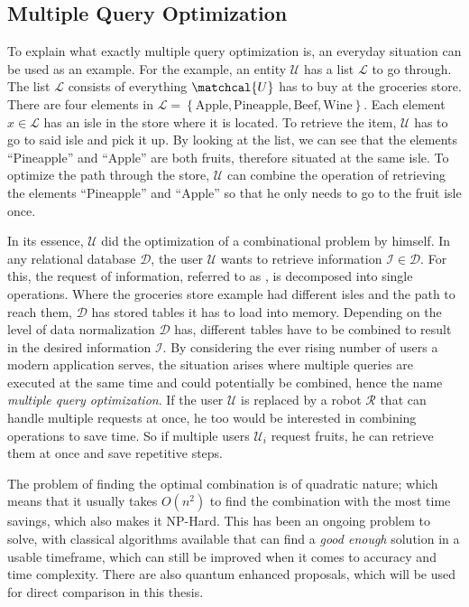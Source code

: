 \subsection{Multiple Query Optimization}
To explain what exactly multiple query optimization is, an everyday situation can be used as an example. For the example, an entity $\mathcal{U}$ has a list $\mathcal{L}$ to go through. The list $\mathcal{L}$ consists of everything $\matchcal{U}$ has to buy at the groceries store. There are four elements in $\mathcal{L} = \left\{ \text{Apple}, \text{Pineapple}, \text{Beef}, \text{Wine}\right\}$. Each element $x \in \mathcal{L}$ has an isle in the store where it is located. To retrieve the item, $\mathcal{U}$ has to go to said isle and pick it up. By looking at the list, we can see that the elements “Pineapple” and “Apple” are both fruits, therefore situated at the same isle. To optimize the path through the store, $\mathcal{U}$ can combine the operation of retrieving the elements “Pineapple” and “Apple” so that he only needs to go to the fruit isle once. \par
In its essence, $\mathcal{U}$ did the optimization of a combinational problem by himself. In any relational database $\mathcal{D}$, the user $\mathcal{U}$ wants to retrieve information $\mathcal{I} \in \mathcal{D}$. For this, the request of information, referred to as , is decomposed into single operations. Where the groceries store example had different isles and the path to reach them, $\mathcal{D}$ has stored tables it has to load into memory. Depending on the level of data normalization $\mathcal{D}$ has\cite{semantic_relational_data_model}, different tables have to be combined to result in the desired information $\mathcal{I}$. By considering the ever rising number of users a modern application serves\cite{uber_technologies_inc_uber_2022}, the situation arises where multiple queries are executed at the same time and could potentially be combined, hence the name \emph{multiple query optimization}. If the user $\mathcal{U}$ is replaced by a robot $\mathcal{R}$ that can handle multiple requests at once, he too would be interested in combining operations to save time. So if multiple users $\mathcal{U}_i$ request fruits, he can retrieve them at once and save repetitive steps. \par
The problem of finding the optimal combination is of quadratic nature; which means that it usually takes $O(n^2)$ to find the combination with the most time savings, which also makes it NP-Hard\cite{sellis_multiple-query_1990}. This has been an ongoing problem to solve, with classical algorithms\cite{kathuria_provable_mqo} available that can find a \emph{good enough} solution in a usable timeframe, which can still be improved when it comes to accuracy and time complexity. There are also quantum enhanced proposals\cite{fankhauser_multiple_2021}, which will be used for direct comparison in this thesis.

